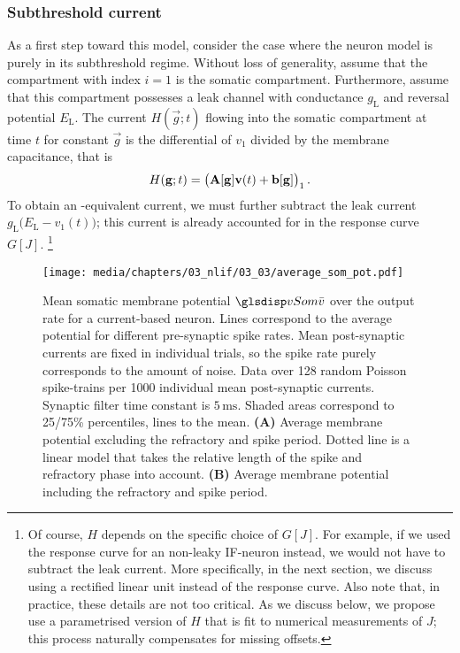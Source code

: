 \subsubsection{Subthreshold current}
As a first step toward this model, consider the case where the neuron model is purely in its subthreshold regime.
Without loss of generality, assume that the compartment with index $i = 1$ is the somatic compartment.
Furthermore, assume that this compartment possesses a leak channel with conductance $g_\mathrm{L}$ and reversal potential $E_\mathrm{L}$.
The current $H(\vec g; t)$ flowing into the somatic compartment at time $t$ for constant $\vec g$ is the differential of $v_1$ divided by the membrane capacitance, that is
\begin{align}
	H(\mathbf{g}; t) = \big(\mathbf{A}[\mathbf{g}] \mathbf{v}(t) + \mathbf{b}[\mathbf{g}] \big)_1 \,.
	\label{eqn:nlif_sub_momentary}
\end{align}
To obtain an \LIF-equivalent current, we must further subtract the leak current $g_\mathrm{L} \big( E_\mathrm{L} - v_1(t) \big)$; this current is already accounted for in the \LIF response curve $G[J]$.%
\footnote{
Of course, $H$ depends on the specific choice of $G[J]$.
For example, if we used the response curve for an non-leaky IF-neuron instead, we would not have to subtract the leak current.
More specifically, in the next section, we discuss using a rectified linear unit instead of the \LIF response curve.
Also note that, in practice, these details are not too critical.
As we discuss below, we propose use a parametrised version of $H$ that is fit to numerical measurements of $J$; this process naturally compensates for missing offsets.
}

\begin{figure}[p]
	\centering
	\texttt{[image: media/chapters/03\_nlif/03\_03/average\_som\_pot.pdf]}%
	{\label{fig:avg_vsom_a}}%
	{\label{fig:avg_vsom_b}}%
	\caption[Mean somatic membrane potential over the neuron output rate]{Mean somatic membrane potential $\vSom$ over the output rate for a current-based \LIF neuron. Lines correspond to the average potential for different pre-synaptic spike rates.
	Mean post-synaptic currents are fixed in individual trials, so the spike rate purely corresponds to the amount of noise.
	Data over 128 random Poisson spike-trains per 1000 individual mean post-synaptic currents.
	Synaptic filter time constant is $5\,\mathrm{ms}$. Shaded areas correspond to 25/75\% percentiles, lines to the mean. \textbf{(A)} Average membrane potential excluding the refractory and spike period. Dotted line is a  linear model that takes the relative length of the spike and refractory phase into account. \textbf{(B)} Average membrane potential including the refractory and spike period.}
	\label{fig:avg_vsom}
\end{figure}

